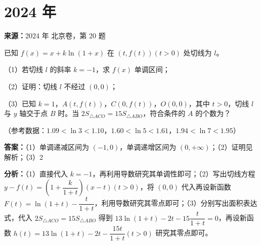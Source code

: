\section*{2024 年}

\begin{question}[points=15]
\textbf{来源：}2024 年 北京卷，第 20 题\par
已知 $f(x)=x+k\ln(1+x)$ 在 $(t,f(t))(t>0)$ 处切线为 $l$。

（1）若切线 $l$ 的斜率 $k=-1$，求 $f(x)$ 单调区间；

（2）证明：切线 $l$ 不经过 $(0,0)$；

（3）已知 $k=1$，$A(t,f(t))$，$C(0,f(t))$，$O(0,0)$，其中 $t>0$，切线 $l$ 与 $y$ 轴交于点 $B$ 时。当 $2S_{\triangle ACO}=15S_{\triangle ABO}$，符合条件的 $A$ 的个数为？

（参考数据：$1.09<\ln3<1.10$，$1.60<\ln5<1.61$，$1.94<\ln7<1.95$）
\begin{solution}
\textbf{答案：}（1）单调递减区间为 $(-1,0)$，单调递增区间为 $(0,+\infty)$；（2）证明见解析；（3）2

\textbf{分析：}（1）直接代入 $k=-1$，再利用导数研究其单调性即可；（2）写出切线方程 $y-f(t)=\left(1+\dfrac{k}{1+t}\right)(x-t)(t>0)$，将 $(0,0)$ 代入再设新函数 $F(t)=\ln(1+t)-\dfrac{t}{1+t}$，利用导数研究其零点即可；（3）分别写出面积表达式，代入 $2S_{\triangle ACO}=15S_{\triangle ABO}$ 得到 $13\ln(1+t)-2t-15\dfrac{t}{1+t}=0$，再设新函数 $h(t)=13\ln(1+t)-2t-\dfrac{15t}{1+t}(t>0)$ 研究其零点即可。


\end{solution}
\end{question}
